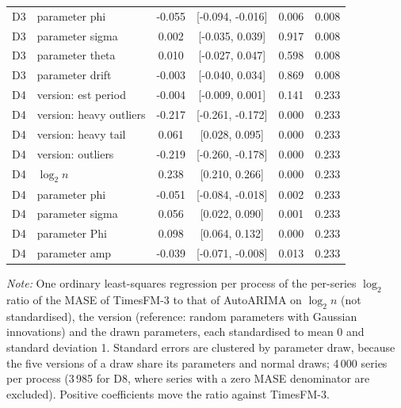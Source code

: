 \begin{table}[!htbp]
\begin{threeparttable}
\begin{tabular}{llcccc}
D3 & parameter phi & -0.055 & [-0.094, -0.016] & 0.006 & 0.008 \\
D3 & parameter sigma & 0.002 & [-0.035, 0.039] & 0.917 & 0.008 \\
D3 & parameter theta & 0.010 & [-0.027, 0.047] & 0.598 & 0.008 \\
D3 & parameter drift & -0.003 & [-0.040, 0.034] & 0.869 & 0.008 \\
D4 & version: est period & -0.004 & [-0.009, 0.001] & 0.141 & 0.233 \\
D4 & version: heavy outliers & -0.217 & [-0.261, -0.172] & 0.000 & 0.233 \\
D4 & version: heavy tail & 0.061 & [0.028, 0.095] & 0.000 & 0.233 \\
D4 & version: outliers & -0.219 & [-0.260, -0.178] & 0.000 & 0.233 \\
D4 & $\log_2 n$ & 0.238 & [0.210, 0.266] & 0.000 & 0.233 \\
D4 & parameter phi & -0.051 & [-0.084, -0.018] & 0.002 & 0.233 \\
D4 & parameter sigma & 0.056 & [0.022, 0.090] & 0.001 & 0.233 \\
D4 & parameter Phi & 0.098 & [0.064, 0.132] & 0.000 & 0.233 \\
D4 & parameter amp & -0.039 & [-0.071, -0.008] & 0.013 & 0.233 \\
\bottomrule
\end{tabular}
\begin{tablenotes}[flushleft]\footnotesize
\item \textit{Note:} One ordinary least-squares regression per process of the per-series $\log_2$ ratio of the MASE of TimesFM-3 to that of AutoARIMA on $\log_2 n$ (not standardised), the version (reference: random parameters with Gaussian innovations) and the drawn parameters, each standardised to mean 0 and standard deviation 1. Standard errors are clustered by parameter draw, because the five versions of a draw share its parameters and normal draws; 4\,000 series per process (3\,985 for D8, where series with a zero MASE denominator are excluded). Positive coefficients move the ratio against TimesFM-3.
\end{tablenotes}
\end{threeparttable}
\end{table}

